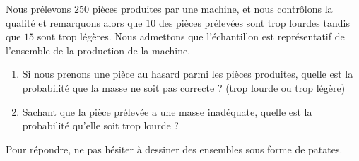 
\begin{exercice}\label{exosmath-0396}

    Nous prélevons \( 250\) pièces produites par une machine, et nous contrôlons la qualité et remarquons alors que \( 10\) des pièces prélevées sont trop lourdes tandis que \( 15\) sont trop légères. Nous admettons que l'échantillon est représentatif de l'ensemble de la production de la machine.

    \begin{enumerate}
        \item
            Si nous prenons une pièce au hasard parmi les pièces produites, quelle est la probabilité que la masse ne soit pas correcte ? (trop lourde ou trop légère)
        \item
            Sachant que la pièce prélevée a une masse inadéquate, quelle est la probabilité qu'elle soit trop lourde ?
    \end{enumerate}
    Pour répondre, ne pas hésiter à dessiner des ensembles sous forme de patates.

\end{exercice}
